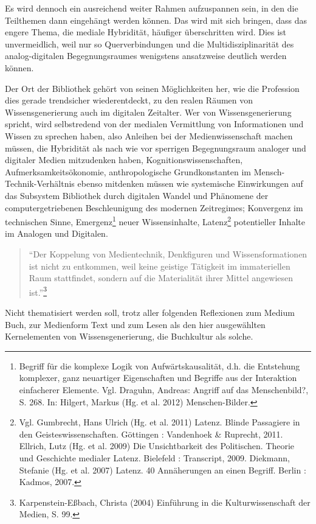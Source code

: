 \documentclass[a4paper,
fontsize=11pt,
oneside,
numbers=noperiodatend,
parskip=half-,
bibliography=totoc,
final
]{scrartcl}
\begin{document}
Es wird dennoch ein ausreichend weiter Rahmen aufzuspannen sein, in den
die Teilthemen dann eingehängt werden können. Das wird mit sich bringen,
dass das engere Thema, die mediale Hybridität, häufiger überschritten
wird. Dies ist unvermeidlich, weil nur so Querverbindungen und die
Multidisziplinarität des analog-digitalen Begegnungsraumes wenigstens
ansatzweise deutlich werden können.

Der Ort der Bibliothek gehört von seinen Möglichkeiten her, wie die
Profession dies gerade trendsicher wiederentdeckt, zu den realen Räumen
von Wissensgenerierung auch im digitalen Zeitalter. Wer von
Wissensgenerierung spricht, wird selbstredend von der medialen
Vermittlung von Informationen und Wissen zu sprechen haben, also
Anleihen bei der Medienwissenschaft machen müssen, die Hybridität als
nach wie vor sperrigen Begegnungsraum analoger und digitaler Medien
mitzudenken haben, Kognitionswissenschaften, Aufmerksamkeitsökonomie,
anthropologische Grundkonstanten im Mensch-Technik-Verhältnis ebenso
mitdenken müssen wie systemische Einwirkungen auf das Subsystem
Bibliothek durch digitalen Wandel und Phänomene der computergetriebenen
Beschleunigung des modernen Zeitregimes; Konvergenz im technischen
Sinne, Emergenz\footnote{Begriff für die komplexe Logik von
  Aufwärtskausalität, d.h. die Entstehung komplexer, ganz neuartiger
  Eigenschaften und Begriffe aus der Interaktion einfacherer Elemente.
  Vgl. Draguhn, Andreas: Angriff auf das Menschenbild?, S. 268. In:
  Hilgert, Markus (Hg. et al. 2012) Menschen-Bilder.} neuer
Wissensinhalte, Latenz\footnote{Vgl. Gumbrecht, Hans Ulrich (Hg. et al.
  2011) Latenz. Blinde Passagiere in den Geisteswissenschaften.
  Göttingen : Vandenhoek \& Ruprecht, 2011. Ellrich, Lutz (Hg. et al.
  2009) Die Unsichtbarkeit des Politischen. Theorie und Geschichte
  medialer Latenz. Bielefeld : Transcript, 2009. Diekmann, Stefanie (Hg.
  et al. 2007) Latenz. 40 Annäherungen an einen Begriff. Berlin :
  Kadmos, 2007.} potentieller Inhalte im Analogen und Digitalen.

\begin{quote}
\enquote{Der Koppelung von Medientechnik, Denkfiguren und
Wissensformationen ist nicht zu entkommen, weil keine geistige Tätigkeit
im immateriellen Raum stattfindet, sondern auf die Materialität ihrer
Mittel angewiesen ist.}\footnote{Karpenstein-Eßbach, Christa (2004)
  Einführung in die Kulturwissenschaft der Medien, S. 99.}
\end{quote}

Nicht thematisiert werden soll, trotz aller folgenden Reflexionen zum
Medium Buch, zur Medienform Text und zum Lesen als den hier ausgewählten
Kernelementen von Wissensgenerierung, die Buchkultur als solche.
\end{document}
